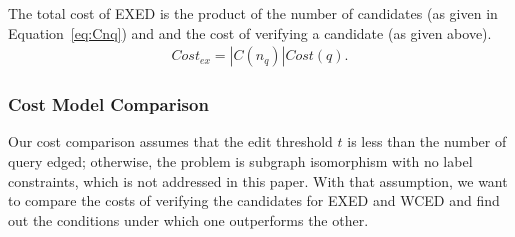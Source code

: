 \documentclass{sigmod}
\newtheorem{lemma}{Lemma}
\begin{document}
The total cost of  EXED is the product of the number of candidates (as given in Equation~\ref{eq:Cnq}) and and the cost of verifying a candidate (as given above). 
\begin{align*}
Cost_{ex} = |C(n_q)|Cost(q).
\end{align*}

\subsubsection{Cost Model Comparison}
Our cost comparison assumes that the edit threshold $t$ is less than the number of query edged; otherwise, the problem is subgraph isomorphism with no label constraints, which is not addressed in this paper. 
With that assumption, we want to compare the costs of verifying the candidates for EXED and WCED and find out the conditions under which one outperforms the other.
\end{document}

